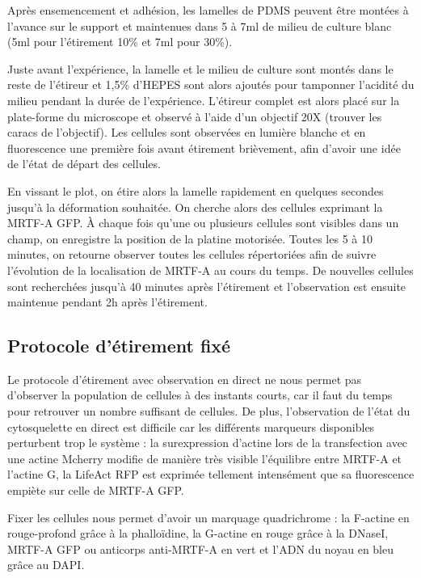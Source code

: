\documentclass{report}
\begin{document}
	Après ensemencement et adhésion, les lamelles de PDMS peuvent être montées à l'avance sur le support et maintenues dans 5 à 7ml de milieu de culture blanc (5ml pour l'étirement 10\% et 7ml pour 30\%). 
	
	Juste avant l'expérience, la lamelle et le milieu de culture sont montés dans le reste de l'étireur et 1,5\% d'HEPES sont alors ajoutés pour tamponner l'acidité du milieu pendant la durée de l'expérience. L'étireur complet est alors placé sur la plate-forme du microscope et observé à l'aide d'un objectif 20X (trouver les caracs de l'objectif). Les cellules sont observées en lumière blanche et en fluorescence une première fois avant étirement brièvement, afin d'avoir une idée de l'état de départ des cellules. 
	
	En vissant le plot, on étire alors la lamelle rapidement en quelques secondes jusqu'à la déformation souhaitée. On cherche alors des cellules exprimant la MRTF-A GFP. À chaque fois qu'une ou plusieurs cellules sont visibles dans un champ, on enregistre la position de la platine motorisée. Toutes les 5 à 10 minutes, on retourne observer toutes les cellules répertoriées afin de suivre l'évolution de la localisation de MRTF-A au cours du temps. De nouvelles cellules sont recherchées jusqu'à 40 minutes après l'étirement et l'observation est ensuite maintenue pendant 2h après l'étirement. 
	
	
	\subsection{Protocole d'étirement fixé}
	
	Le protocole d'étirement avec observation en direct ne nous permet pas d'observer la population de cellules à des instants courts, car il faut du temps pour retrouver un nombre suffisant de cellules. De plus, l'observation de l'état du cytosquelette en direct est difficile car les différents marqueurs disponibles perturbent trop le système : la surexpression d'actine lors de la transfection avec une actine Mcherry modifie de manière très visible l'équilibre entre MRTF-A et l'actine G, la LifeAct RFP est exprimée tellement intensément que sa fluorescence empiète sur celle de MRTF-A GFP. 
	
	Fixer les cellules nous permet d'avoir un marquage quadrichrome : la F-actine en rouge-profond grâce à la phalloïdine, la G-actine en rouge grâce à la DNaseI, MRTF-A GFP ou anticorps anti-MRTF-A en vert et l'ADN du noyau en bleu grâce au DAPI. 
	
\end{document}
